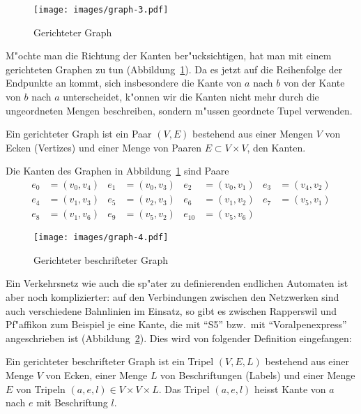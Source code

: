 \begin{figure}
\begin{center}
\texttt{[image: images/graph-3.pdf]}
\end{center}
\caption{Gerichteter Graph\label{grundlagen:gerichtetergraph}}
\end{figure}
M"ochte man die Richtung der Kanten ber"ucksichtigen,
hat man mit einem gerichteten
Graphen zu tun (Abbildung~\ref{grundlagen:gerichtetergraph}).
Da es jetzt auf die Reihenfolge der Endpunkte an kommt,
sich insbesondere die Kante von $a$ nach $b$ von der Kante von $b$ nach
$a$ unterscheidet, k"onnen wir die Kanten nicht mehr durch die ungeordneten
Mengen beschreiben, sondern m"ussen geordnete Tupel verwenden.

\begin{definition}
\label{def_gerichteter_graph}
Ein gerichteter Graph ist ein Paar $(V,E)$ bestehend aus einer
Mengen $V$ von Ecken (Vertizes) und einer Menge von Paaren $E\subset V\times V$,
den Kanten.
\end{definition}

Die Kanten des Graphen in Abbildung~\ref{grundlagen:gerichtetergraph}
sind Paare
\begin{align*}
e_0&=(v_0,v_4)
&
e_1&=(v_0,v_3)
&
e_2&=(v_0,v_1)
&
e_3&=(v_4,v_2)
\\
e_4&=(v_1,v_3)
&
e_5&=(v_2,v_3)
&
e_6&=(v_1,v_2)
&
e_7&=(v_5,v_1)
\\
e_8&=(v_1,v_6)
&
e_9&=(v_5,v_2)
&
e_{10}&=(v_5,v_6)
\end{align*}

\begin{figure}
\begin{center}
\texttt{[image: images/graph-4.pdf]}
\end{center}
\caption{Gerichteter beschrifteter Graph\label{grundlagen:beschrgraph}}
\end{figure}
Ein Verkehrsnetz wie auch die sp"ater zu definierenden endlichen
Automaten ist aber noch komplizierter: auf den Verbindungen zwischen
den Netzwerken sind auch verschiedene Bahnlinien im Einsatz, so gibt
es zwischen Rapperswil und Pf"affikon zum Beispiel je eine Kante, die
mit ``S5'' bzw.~mit ``Voralpenexpress'' angeschrieben ist
(Abbildung~\ref{grundlagen:beschrgraph}). Dies
wird von folgender Definition eingefangen:

\begin{definition}
\label{def_gerichteter_beschrifteter_graph}
Ein gerichteter beschrifteter Graph ist ein Tripel $(V,E,L)$ bestehend
aus einer Menge $V$ von Ecken, einer Menge $L$ von Beschriftungen (Labels) und 
einer Menge $E$ von Tripeln $(a,e,l)\in V\times V\times L$. Das
Tripel $(a,e,l)$ heisst Kante von $a$ nach $e$ mit Beschriftung $l$.
\end{definition}

